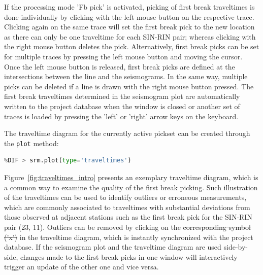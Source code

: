 \documentclass[a4paper,fleqn]{cas-sc}
\providecommand{\DIFadd}[1]{{\protect\color{blue}\uwave{#1}}} %
\providecommand{\DIFdel}[1]{{\protect\color{red}\sout{#1}}}                      %
\providecommand{\DIFaddbegin}{} %
\providecommand{\DIFaddend}{} %
\providecommand{\DIFdelbegin}{} %
\providecommand{\DIFdelend}{} %
\providecommand{\DIFmodbegin}{} %
\providecommand{\DIFmodend}{} %
\newcommand{\DIFscaledelfig}{0.5}
\newlength{\DIFdelgraphicswidth} %
\newlength{\DIFdelgraphicsheight} %
\newcommand{\DIFaddincludegraphics}[2][]{{\color{blue}\fbox{\DIFOincludegraphics[#1]{#2}}}} %
\newcommand{\DIFdelincludegraphics}[2][]{%
\sbox{\DIFdelgraphicsbox}{\DIFOincludegraphics[#1]{#2}}%
\settoboxwidth{\DIFdelgraphicswidth}{\DIFdelgraphicsbox} %
\settoboxtotalheight{\DIFdelgraphicsheight}{\DIFdelgraphicsbox} %
\scalebox{\DIFscaledelfig}{%
\parbox[b]{\DIFdelgraphicswidth}{\usebox{\DIFdelgraphicsbox}\\[-\baselineskip] \rule{\DIFdelgraphicswidth}{0em}}\llap{\resizebox{\DIFdelgraphicswidth}{\DIFdelgraphicsheight}{%
\setlength{\unitlength}{\DIFdelgraphicswidth}%
\begin{picture}(1,1)%
\thicklines\linethickness{2pt} %
{\color[rgb]{1,0,0}\put(0,0){\framebox(1,1){}}}%
{\color[rgb]{1,0,0}\put(0,0){\line( 1,1){1}}}%
{\color[rgb]{1,0,0}\put(0,1){\line(1,-1){1}}}%
\end{picture}%
}\hspace*{3pt}}} %
} %
\DeclareRobustCommand{\DIFaddbegin}{\DIFOaddbegin \let\includegraphics\DIFaddincludegraphics} %
\DeclareRobustCommand{\DIFaddend}{\DIFOaddend \let\includegraphics\DIFOincludegraphics} %
\DeclareRobustCommand{\DIFdelbegin}{\DIFOdelbegin \let\includegraphics\DIFdelincludegraphics} %
\DeclareRobustCommand{\DIFdelend}{\DIFOaddend \let\includegraphics\DIFOincludegraphics} %
\begin{document}
If the processing mode 'Fb pick' is activated, picking of first break traveltimes is done individually by clicking with the left mouse button on the respective trace. Clicking again on the same trace will set the first break pick to the new location as there can only be one traveltime for each SIN-RIN pair; whereas clicking with the right mouse button deletes the pick. Alternatively, first break picks can be set for multiple traces by pressing the left mouse button and moving the cursor. 
Once the left mouse button is released, first break picks are defined at the intersections between the line and the seismograms. In the same way, multiple picks can be deleted if a line is drawn with the right mouse button pressed. The first break traveltimes determined in the seismogram plot are automatically written to the project database when the window is closed or another set of traces is loaded by pressing the 'left' or 'right' arrow keys on the keyboard. 

The traveltime diagram for the currently active pickset can be created through the \texttt{plot} method:
\DIFdelbegin %
\DIFdelend \DIFaddbegin \DIFmodbegin
\begin{lstlisting}[language=Python, firstnumber=20,alsolanguage=DIFcode]
%DIF > # Plot traveltime diagram
%DIF > srm.plot(type='traveltimes')
\end{lstlisting}
\DIFmodend
\DIFaddend Figure~\ref{fig:traveltimes_intro} presents an exemplary traveltime diagram, which is a common way to examine the quality of the first break picking. Such illustration of the traveltimes can be used to identify outliers or erroneous measurements, which are commonly associated to traveltimes with substantial deviations from those observed at adjacent stations such as the first break pick for the SIN-RIN pair (23, 11). Outliers can be removed by clicking on the \DIFdelbegin \DIFdel{corresponding symbol ('x') }\DIFdelend \DIFaddbegin \DIFadd{respective data point }\DIFaddend in the traveltime diagram, which is instantly synchronized with the project database. If the seismogram plot and the traveltime diagram are used side-by-side, changes made to the first break picks in one window will interactively trigger an update of the other one and vice versa.
\DIFdelbegin %
\end{document}
